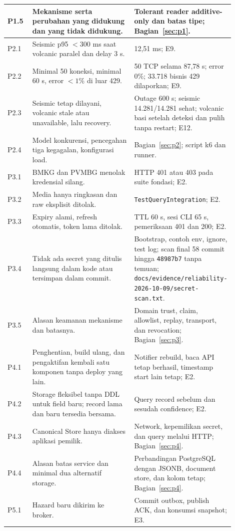 \begin{longtable}{P{0.11\linewidth}P{0.45\linewidth}P{0.34\linewidth}}
P1.5 & Mekanisme serta perubahan yang didukung dan yang tidak didukung. & Tolerant reader additive-only dan batas tipe; Bagian~\ref{sec:p1}.\\
\midrule
P2.1 & Seismic p95 $<300$ ms saat volcanic paralel dan delay 3 s. & 12,51 ms; E9.\\
P2.2 & Minimal 50 koneksi, minimal 60 s, error $<1\%$ di luar 429. & 50 TCP selama 87,78 s; error 0\%; 33.718 bisnis 429 dilaporkan; E9.\\
P2.3 & Seismic tetap dilayani, volcanic stale atau unavailable, lalu recovery. & Outage 600 s; seismic 14.281/14.281 sehat; volcanic basi setelah deteksi dan pulih tanpa restart; E12.\\
P2.4 & Model konkurensi, pencegahan tiga kegagalan, konfigurasi load. & Bagian~\ref{sec:p2}; script k6 dan runner.\\
\midrule
P3.1 & BMKG dan PVMBG menolak kredensial silang. & HTTP 401 atau 403 pada suite fondasi; E2.\\
P3.2 & Media hanya ringkasan dan raw eksplisit ditolak. & \texttt{TestQueryIntegration}; E2.\\
P3.3 & Expiry alami, refresh otomatis, token lama ditolak. & TTL 60 s, sesi CLI 65 s, pemeriksaan 401 dan 200; E2.\\
P3.4 & Tidak ada secret yang ditulis langsung dalam kode atau tersimpan dalam commit. & Bootstrap, contoh env, ignore, test log; scan final 58 commit hingga \texttt{48987b7} tanpa temuan; \nolinkurl{docs/evidence/reliability-2026-10-09/secret-scan.txt}.\\
P3.5 & Alasan keamanan mekanisme dan batasnya. & Domain trust, claim, allowlist, replay, transport, dan revocation; Bagian~\ref{sec:p3}.\\
\midrule
P4.1 & Penghentian, build ulang, dan pengaktifan kembali satu komponen tanpa deploy yang lain. & Notifier rebuild, baca API tetap berhasil, timestamp start lain tetap; E2.\\
P4.2 & Storage fleksibel tanpa DDL untuk field baru; record lama dan baru tersedia bersama. & Query record sebelum dan sesudah confidence; E2.\\
P4.3 & Canonical Store hanya diakses aplikasi pemilik. & Network, kepemilikan secret, dan query melalui HTTP; Bagian~\ref{sec:p4}.\\
P4.4 & Alasan batas service dan minimal dua alternatif storage. & Perbandingan PostgreSQL dengan JSONB, document store, dan kolom tetap; Bagian~\ref{sec:p4}.\\
\midrule
P5.1 & Hazard baru dikirim ke broker. & Commit outbox, publish ACK, dan konsumsi snapshot; E3.\\

\end{longtable}
